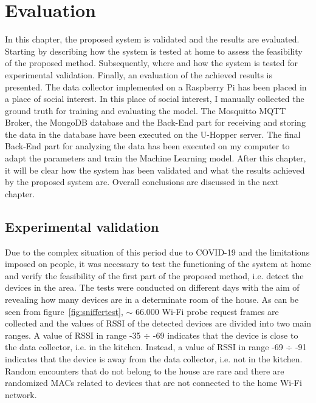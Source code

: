 \chapter{Evaluation}
\label{cha:evaluation}
\vspace{0.4 cm} 

In this chapter, the proposed system is validated and the results are evaluated.
Starting by describing how the system is tested at home to assess the feasibility of the proposed method. Subsequently, where and how the system is tested for experimental validation. Finally, an evaluation of the achieved results is presented. The data collector implemented on a Raspberry Pi has been placed in a place of social interest. In this place of social interest, I manually collected the ground truth for training and evaluating the model. The Mosquitto MQTT Broker, the MongoDB database and the Back-End part for receiving and storing the data in the database have been executed on the U-Hopper server. The final Back-End part for analyzing the data has been executed on my computer to adapt the parameters and train the Machine Learning model. After this chapter, it will be clear how the system has been validated and what the results achieved by the proposed system are. Overall conclusions are discussed in the next chapter.


\section{Experimental validation}
\label{sec:expval}
\vspace{0.2 cm} 

Due to the complex situation of this period due to COVID-19 and the limitations imposed on people, it was necessary to test the functioning of the system at home and verify the feasibility of the first part of the proposed method, i.e. detect the devices in the area. The tests were conducted on different days with the aim of revealing how many devices are in a determinate room of the house. As can be seen from figure~\ref{fig:sniffertest}, $\sim$ 66.000 Wi-Fi probe request frames are collected and the values of RSSI of the detected devices are divided into two main ranges. A value of RSSI in range -35 $\div$ -69 indicates that the device is close to the data collector, i.e. in the kitchen. Instead, a value of RSSI in range -69 $\div$ -91 indicates that the device is away from the data collector, i.e. not in the kitchen. Random encounters that do not belong to the house are rare and there are randomized MACs related to devices that are not connected to the home Wi-Fi network.


